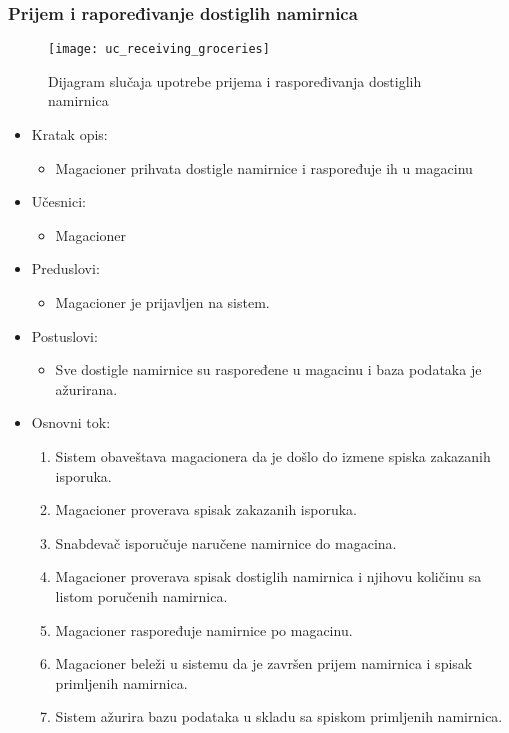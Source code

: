 
\subsubsection{Prijem i rapoređivanje dostiglih namirnica}
\begin{figure}[H]
	\begin{center}
		\texttt{[image: uc\_receiving\_groceries]}
		\caption{Dijagram slučaja upotrebe prijema i raspoređivanja dostiglih namirnica}
	\end{center}
\end{figure}
	\begin{itemize}
		\item{Kratak opis:} 
		\begin{itemize}
			\item{Magacioner prihvata dostigle namirnice i raspoređuje ih u magacinu}
		\end{itemize}
		\item{Učesnici:} 
		\begin{itemize}
			\item{Magacioner}
	
		\end{itemize}		
		
		\item{Preduslovi:}
		\begin{itemize}
			\item{Magacioner je prijavljen na sistem.}
		\end{itemize}
		
		\item{Postuslovi:}
		\begin{itemize}
			\item{Sve dostigle namirnice su raspoređene u magacinu i baza podataka je ažurirana.}
		\end{itemize}
		
		\item{Osnovni tok:}
		\begin{enumerate}
			\item{Sistem obaveštava magacionera da je došlo do izmene spiska zakazanih isporuka.}
			\item{Magacioner proverava spisak zakazanih isporuka.}
			\item{Snabdevač isporučuje naručene namirnice do magacina.}
			\item{Magacioner proverava spisak dostiglih namirnica i njihovu količinu sa listom poručenih namirnica.}
			\item{Magacioner raspoređuje namirnice po magacinu.}
			\item{Magacioner beleži u sistemu da je završen prijem namirnica i spisak primljenih namirnica.}
			\item{Sistem ažurira bazu podataka u skladu sa spiskom primljenih namirnica.}
		\end{enumerate}
		

\end{itemize}
